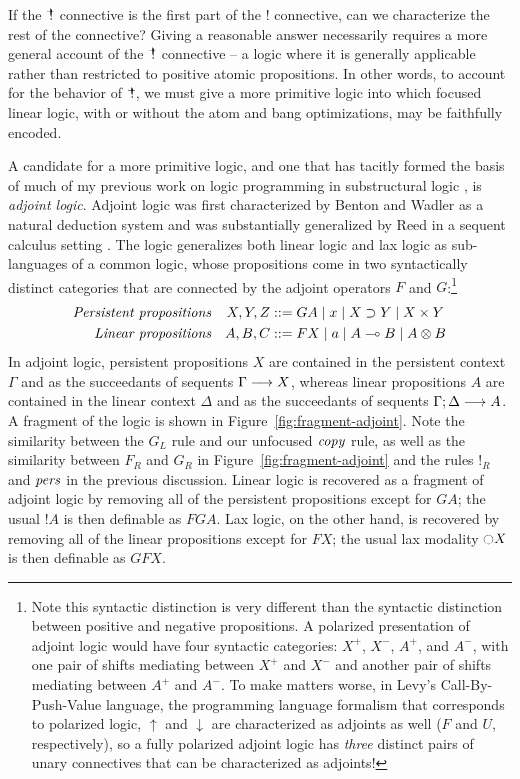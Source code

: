 If the $\mbox{\hspace{2pt}$\mathbb !$\hspace{-5pt}$^+$\hspace{-1pt}}$ connective is the first part of the $!$ connective,
can we characterize the rest of the connective? Giving a reasonable
answer necessarily requires a more general account of the $\mbox{\hspace{2pt}$\mathbb !$\hspace{-5pt}$^+$\hspace{-1pt}}$
connective -- a logic where it is generally applicable rather than
restricted to positive atomic propositions. In other words, to account
for the behavior of $\mbox{\hspace{2pt}$\mathbb !$\hspace{-5pt}$^+$\hspace{-1pt}}$, we must give a more primitive logic into
which focused linear logic, with or without the atom and bang
optimizations, may be faithfully encoded. 



A candidate for a more primitive logic, and one that has tacitly
formed the basis of much of my previous work on logic programming in
substructural logic
\cite{pfenning09substructural,simmons09weak,simmons11logical}, is {\it
  adjoint logic}.  Adjoint logic was first characterized by Benton and
Wadler as a natural deduction system \cite{benton96linear} and was
substantially generalized by Reed in a sequent calculus setting
\cite{reed09judgmental}. The logic generalizes both linear logic and
lax logic as sub-languages of a common logic, whose propositions come
in two syntactically distinct categories that are connected by the
adjoint operators $F$ and $G$:\footnote{Note this syntactic
  distinction is very different than the syntactic distinction between
  positive and negative propositions. A polarized presentation of
  adjoint logic would have four syntactic categories: $X^+$, $X^-$,
  $A^+$, and $A^-$, with one pair of shifts mediating between $X^+$
  and $X^-$ and another pair of shifts mediating between $A^+$ and
  $A^-$. To make matters worse, in Levy's Call-By-Push-Value language,
  the programming language formalism that corresponds to polarized
  logic, ${\uparrow}$ and ${\downarrow}$ are characterized as adjoints
  as well ($F$ and $U$, respectively), so a fully polarized adjoint
  logic has {\it three} distinct pairs of unary connectives that can
  be characterized as adjoints!}
\begin{align*}
\mbox{\it Persistent propositions} & &
X, Y, Z & ::= G A \mid x \mid X \supset Y \mid X \times Y\\
\mbox{\it Linear propositions} & & 
A, B, C & ::= F X \mid a \mid A \multimap B \mid A \otimes B
\end{align*}
In adjoint logic, persistent propositions $X$ are contained in the
persistent context $\Gamma$ and as the succeedants of sequents
${\Gamma} \longrightarrow {X} \mathstrut$, whereas linear propositions $A$ are contained in
the linear context $\Delta$ and as the succeedants of sequents
${\Gamma};{\Delta} \longrightarrow {A} \mathstrut$. A fragment of the logic is shown in
Figure~\ref{fig:fragment-adjoint}.  Note the similarity between the
$G_L$ rule and our unfocused ${\it copy}$ rule, as well as the
similarity between $F_R$ and $G_R$ in
Figure~\ref{fig:fragment-adjoint} and the rules ${!}_R$ and ${\it
  pers}$ in the previous discussion.  Linear logic is recovered as a
fragment of adjoint logic by removing all of the persistent
propositions except for $GA$; the usual ${!}A$ is then definable as
$FGA$. Lax logic, on the other hand, is recovered by removing all of
the linear propositions except for $FX$; the usual lax modality
$\ocircle X$ is then definable as $GFX$.

